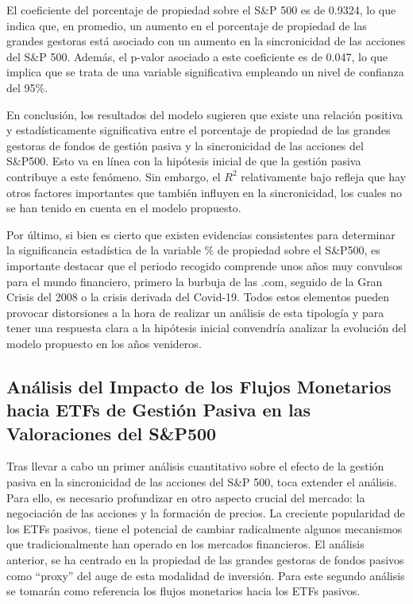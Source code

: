 \documentclass[12pt,a4paper]{article}
\begin{document}
El coeficiente del porcentaje de propiedad sobre el S\&P 500 es de 0.9324, lo que indica que, en promedio, un aumento en el porcentaje de propiedad de las grandes gestoras está asociado con un aumento en la sincronicidad de las acciones del S\&P 500. Además, el p-valor asociado a este coeficiente es de 0.047, lo que implica que se trata de una variable significativa empleando un nivel de confianza del 95\%.

En conclusión, los resultados del modelo sugieren que existe una relación positiva y estadísticamente significativa entre el porcentaje de propiedad de las grandes gestoras de fondos de gestión pasiva y la sincronicidad de las acciones del S\&P500. Esto va en línea con la hipótesis inicial de que la gestión pasiva contribuye a este fenómeno. Sin embargo, el $R^2$ relativamente bajo refleja que hay otros factores importantes que también influyen en la sincronicidad, los cuales no se han tenido en cuenta en el modelo propuesto.

Por último, si bien es cierto que existen evidencias consistentes para determinar la significancia estadística de la variable \% de propiedad sobre el S\&P500, es importante destacar que el periodo recogido comprende unos años muy convulsos para el mundo financiero, primero la burbuja de las .com, seguido de la Gran Crisis del 2008 o la crisis derivada del Covid-19. Todos estos elementos pueden provocar distorsiones a la hora de realizar un análisis de esta tipología y para tener una respuesta clara a la hipótesis inicial convendría analizar la evolución del modelo propuesto en los años venideros.

\subsection{Análisis del Impacto de los Flujos Monetarios hacia ETFs de Gestión Pasiva en las Valoraciones del S\&P500}

Tras llevar a cabo un primer análisis cuantitativo sobre el efecto de la gestión pasiva en la sincronicidad de las acciones del S\&P 500, toca extender el análisis. Para ello, es necesario profundizar en otro aspecto crucial del mercado: la negociación de las acciones y la formación de precios. La creciente popularidad de los ETFs pasivos, tiene el potencial de cambiar radicalmente algunos mecanismos que tradicionalmente han operado en los mercados financieros. El análisis anterior, se ha centrado en la propiedad de las grandes gestoras de fondos pasivos como ``proxy'' del auge de esta modalidad de inversión. Para este segundo análisis se tomarán como referencia los flujos monetarios hacia los ETFs pasivos.
\end{document}

